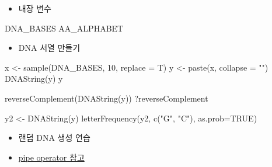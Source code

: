 \documentclass[
]{book}
\newenvironment{Shaded}{\begin{snugshade}}{\end{snugshade}}
\newcommand{\AttributeTok}[1]{\textcolor[rgb]{0.77,0.63,0.00}{#1}}
\newcommand{\ConstantTok}[1]{\textcolor[rgb]{0.00,0.00,0.00}{#1}}
\newcommand{\DecValTok}[1]{\textcolor[rgb]{0.00,0.00,0.81}{#1}}
\newcommand{\FunctionTok}[1]{\textcolor[rgb]{0.00,0.00,0.00}{#1}}
\newcommand{\NormalTok}[1]{#1}
\newcommand{\OtherTok}[1]{\textcolor[rgb]{0.56,0.35,0.01}{#1}}
\newcommand{\StringTok}[1]{\textcolor[rgb]{0.31,0.60,0.02}{#1}}
\providecommand{\tightlist}{%
  \setlength{\itemsep}{0pt}\setlength{\parskip}{0pt}}
\begin{document}
\begin{itemize}
\tightlist
\item
  내장 변수
\end{itemize}

\begin{Shaded}
\begin{Highlighting}[]
\NormalTok{DNA\_BASES}
\NormalTok{AA\_ALPHABET}
\end{Highlighting}
\end{Shaded}

\begin{itemize}
\tightlist
\item
  DNA 서열 만들기
\end{itemize}

\begin{Shaded}
\begin{Highlighting}[]

\NormalTok{x }\OtherTok{\textless{}{-}} \FunctionTok{sample}\NormalTok{(DNA\_BASES, }\DecValTok{10}\NormalTok{, }\AttributeTok{replace =}\NormalTok{ T)}
\NormalTok{y }\OtherTok{\textless{}{-}} \FunctionTok{paste}\NormalTok{(x, }\AttributeTok{collapse =} \StringTok{""}\NormalTok{)}
\FunctionTok{DNAString}\NormalTok{(y)}
\NormalTok{y}

\FunctionTok{reverseComplement}\NormalTok{(}\FunctionTok{DNAString}\NormalTok{(y))}
\NormalTok{?reverseComplement}

\NormalTok{y2 }\OtherTok{\textless{}{-}} \FunctionTok{DNAString}\NormalTok{(y)}
\FunctionTok{letterFrequency}\NormalTok{(y2, }\FunctionTok{c}\NormalTok{(}\StringTok{"G"}\NormalTok{, }\StringTok{"C"}\NormalTok{), }\AttributeTok{as.prob=}\ConstantTok{TRUE}\NormalTok{)}
\end{Highlighting}
\end{Shaded}

\begin{itemize}
\tightlist
\item
  랜덤 DNA 생성 연습
\item
  \href{https://greendaygh.github.io/kribbr2022/tidyverse.html\#pipe-operator}{pipe operator 참고}
\end{itemize}
\end{document}
